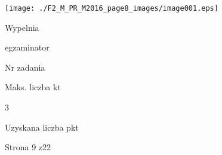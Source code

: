 \documentclass[a4paper,12pt]{article}
\begin{document}
\begin{center}
\texttt{[image: ./F2\_M\_PR\_M2016\_page8\_images/image001.eps]}
\end{center}
Wypelnia

egzaminator

Nr zadania

Maks. liczba kt

3

Uzyskana liczba pkt

Strona 9 z22
\end{document}

